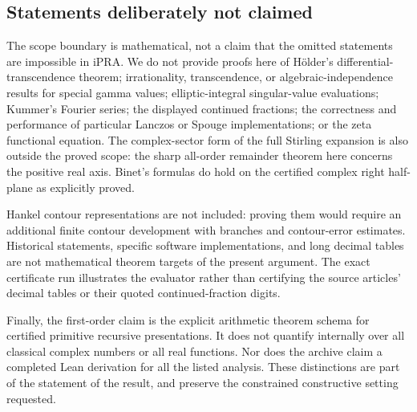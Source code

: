 \subsection{Statements deliberately not claimed}

The scope boundary is mathematical, not a claim that the omitted
statements are impossible in iPRA. We do not provide proofs here of
H\"older's differential-transcendence theorem; irrationality,
transcendence, or algebraic-independence results for special gamma values;
elliptic-integral singular-value evaluations; Kummer's Fourier series;
the displayed continued fractions; the correctness and performance of
particular Lanczos or Spouge implementations; or the zeta functional
equation. The complex-sector form of the full Stirling expansion is
also outside the proved scope: the sharp all-order remainder theorem
here concerns the positive real axis. Binet's formulas do hold on the
certified complex right half-plane as explicitly proved.

Hankel contour representations are not included: proving them would
require an additional finite contour development with branches and
contour-error estimates. Historical statements, specific software
implementations, and long decimal tables are not mathematical theorem
targets of the present argument. The exact certificate run illustrates
the evaluator rather than certifying the source articles' decimal
tables or their quoted continued-fraction digits.

Finally, the first-order claim is the explicit arithmetic theorem schema
for certified primitive recursive presentations. It does not quantify
internally over all classical complex numbers or all real functions.
Nor does the archive claim a completed Lean derivation for all the
listed analysis. These distinctions are part of the statement of the
result, and preserve the constrained constructive setting requested.
